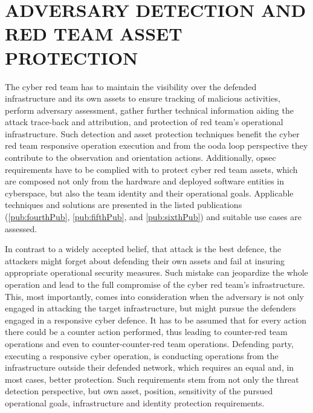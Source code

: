 \section{ADVERSARY DETECTION AND RED TEAM ASSET PROTECTION}
\label{sec:protection}
\glsresetall
The cyber red team has to maintain the visibility over the defended infrastructure and its own assets to ensure tracking of malicious activities, perform adversary assessment, gather further technical information aiding the attack trace-back and attribution, and protection of red team's operational infrastructure. Such detection and asset protection techniques benefit the cyber red team responsive operation execution and from the \gls{ooda} loop perspective they contribute to the observation and orientation actions.
Additionally, \gls{opsec} requirements have to be complied with to protect cyber red team assets, which are composed not only from the hardware and deployed software entities in cyberspace, but also the team identity and their operational goals.
Applicable techniques and solutions are presented in the listed publications (\ref{pub:fourthPub}, \ref{pub:fifthPub}, and \ref{pub:sixthPub}) and suitable use cases are assessed.

In contrast to a widely accepted belief, that attack is the best defence, the attackers might forget about defending their own assets and fail at insuring appropriate operational security measures. Such mistake can jeopardize the whole operation and lead to the full compromise of the cyber red team's infrastructure. This, most importantly, comes into consideration when the adversary is not only engaged in attacking the target infrastructure, but might pursue the defenders engaged in a responsive cyber defence. It has to be assumed that for every action there could be a counter action performed, thus leading to counter-red team operations and even to counter-counter-red team operations.
Defending party, executing a responsive cyber operation, is conducting operations from the infrastructure outside their defended network, which requires an equal and, in most cases, better protection. Such requirements stem from not only the threat detection perspective, but own asset, position, sensitivity of the pursued operational goals, infrastructure and identity protection requirements.

